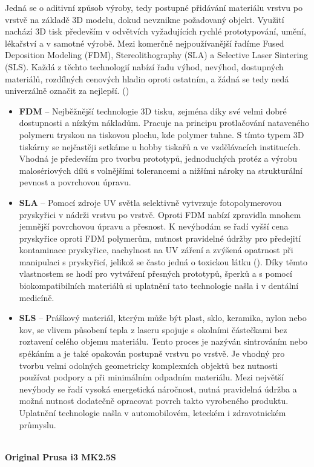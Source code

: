 \documentclass[twoside, 12pt]{article}
\begin{document}
Jedná se o aditivní způsob výroby, tedy postupné přidávání materiálu vrstvu po vrstvě na základě 3D modelu, dokud nevznikne požadovaný objekt. Využití nachází 3D tisk především v odvětvích vyžadujících rychlé prototypování, umění, lékařství a v samotné výrobě. Mezi komerčně nejpoužívanější řadíme Fused Deposition Modeling (FDM), Stereolithography (SLA) a Selective Laser Sintering (SLS). Každá z těchto technologií nabízí řadu výhod, nevýhod, dostupných materiálů, rozdílných cenových hladin oproti ostatním, a žádná se tedy nedá univerzálně označit za nejlepší. (\cite{Zaklady3Dtisku})

\begin{itemize}
    \item \textbf{FDM} -- Nejběžnější technologie 3D tisku, zejména díky své velmi dobré dostupnosti a nízkým nákladům. Pracuje na principu protlačování nataveného polymeru tryskou na tiskovou plochu, kde polymer tuhne. S tímto typem 3D tiskárny se nejčastěji setkáme u hobby tiskařů a ve vzdělávacích institucích. Vhodná je především pro tvorbu prototypů, jednoduchých protéz a výrobu malosériových dílů s volnějšími tolerancemi a nižšími nároky na strukturální pevnost a povrchovou úpravu.
    
    \item \textbf{SLA} -- Pomocí zdroje UV světla selektivně vytvrzuje fotopolymerovou pryskyřici v nádrži vrstvu po vrstvě. Oproti FDM nabízí zpravidla mnohem jemnější povrchovou úpravu a přesnost. K nevýhodám se řadí vyšší cena pryskyřice oproti FDM polymerům, nutnost pravidelné údržby pro předejití kontaminace pryskyřice, nachylnost na UV záření a zvýšená opatrnost při manipulaci s pryskyřicí, jelikož se často jedná o toxickou látku (\cite{SLAtoxic}). Díky těmto vlastnostem se hodí pro vytváření přesných prototypů, šperků a s pomocí biokompatibilních materiálů si uplatnění tato technologie našla i v dentální medicíně.

    \item \textbf{SLS} -- Práškový materiál, kterým může být plast, sklo, keramika, nylon nebo kov, se vlivem působení tepla z laseru spojuje s okolními částečkami bez roztavení celého objemu materiálu. Tento proces je nazýván sintrováním nebo spékáním a je také opakován postupně vrstvu po vrstvě. Je vhodný pro tvorbu velmi odolných geometricky komplexních objektů bez nutnosti používat podpory a při minimálním odpadním materiálu. Mezi největší nevýhody se řadí vysoká energetická náročnost, nutná pravidelná údržba a možná nutnost dodatečně opracovat povrch takto vyrobeného produktu. Uplatnění technologie našla v automobilovém, leteckém i zdravotnickém průmyslu.
\end{itemize}
~\\
\textbf{Original Prusa i3 MK2.5S}
\end{document}

